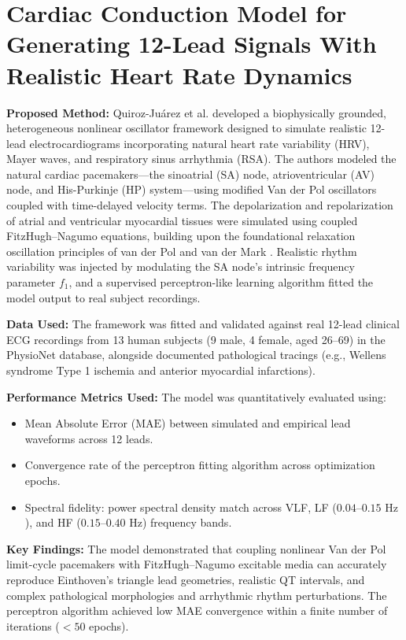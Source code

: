 \newpage
\section{Cardiac Conduction Model for Generating 12-Lead Signals With Realistic Heart Rate Dynamics \cite{quiroz2018cardiac}}

\textbf{Proposed Method:} Quiroz-Ju{\'a}rez et al. \cite{quiroz2018cardiac} developed a biophysically grounded, heterogeneous nonlinear oscillator framework designed to simulate realistic 12-lead electrocardiograms incorporating natural heart rate variability (HRV), Mayer waves, and respiratory sinus arrhythmia (RSA). The authors modeled the natural cardiac pacemakers---the sinoatrial (SA) node, atrioventricular (AV) node, and His-Purkinje (HP) system---using modified Van der Pol oscillators coupled with time-delayed velocity terms. The depolarization and repolarization of atrial and ventricular myocardial tissues were simulated using coupled FitzHugh--Nagumo equations, building upon the foundational relaxation oscillation principles of van der Pol and van der Mark \cite{vanderpol1928}. Realistic rhythm variability was injected by modulating the SA node's intrinsic frequency parameter $f_1$, and a supervised perceptron-like learning algorithm fitted the model output to real subject recordings.

\textbf{Data Used:} The framework was fitted and validated against real 12-lead clinical ECG recordings from 13 human subjects (9 male, 4 female, aged 26--69) in the PhysioNet database, alongside documented pathological tracings (e.g., Wellens syndrome Type 1 ischemia and anterior myocardial infarctions).

\textbf{Performance Metrics Used:} The model was quantitatively evaluated using:
\begin{itemize}
    \item Mean Absolute Error ($\text{MAE}$) between simulated and empirical lead waveforms across 12 leads.
    \item Convergence rate of the perceptron fitting algorithm across optimization epochs.
    \item Spectral fidelity: power spectral density match across VLF, LF ($0.04\text{--}0.15\text{ Hz}$), and HF ($0.15\text{--}0.40\text{ Hz}$) frequency bands.
\end{itemize}

\textbf{Key Findings:} The model demonstrated that coupling nonlinear Van der Pol limit-cycle pacemakers with FitzHugh--Nagumo excitable media can accurately reproduce Einthoven's triangle lead geometries, realistic QT intervals, and complex pathological morphologies and arrhythmic rhythm perturbations. The perceptron algorithm achieved low MAE convergence within a finite number of iterations ($< 50$ epochs).

